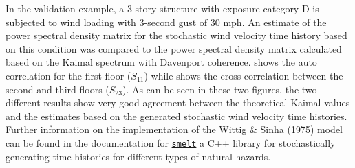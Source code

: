 In the validation example, a 3-story structure with exposure category
D is subjected to wind loading with 3-second gust of 30 mph. An
estimate of the power spectral density matrix for the stochastic wind
velocity time history based on this condition was compared to the
power spectral density matrix calculated based on the Kaimal spectrum
with Davenport coherence.  shows the auto correlation
for the first floor ($S_{11}$) while  shows the cross
correlation between the second and third floors ($S_{23}$). As can be seen in
these two figures, the two different results show very good agreement
between the theoretical Kaimal values and the estimates based on the
generated stochastic wind velocity time histories. Further information
on the implementation of the Wittig \& Sinha (1975) model can be found
in the documentation
for \href{https://github.com/NHERI-SimCenter/smelt}{\texttt{smelt}}\textemdash
a C++ library for stochastically generating time histories for
different types of natural hazards.
